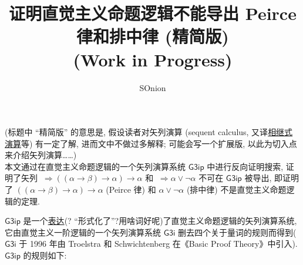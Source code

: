 \documentclass{article}
\title{证明直觉主义命题逻辑不能导出 Peirce 律和排中律 (精简版)\\(Work in Progress)}
\author{SOnion}
\def\To{\Rightarrow}
\def\a{\alpha}
\def\b{\beta}
\def\Gthreeip{$ \mathsf{G3ip}$ }
\def\Gthreei{$ \mathsf{G3i}$ }
\begin{document}
\maketitle




(标题中 ``精简版'' 的意思是, 假设读者对矢列演算 (sequent calculus, 又译\underline{相继式演算}等) 有一定了解, 进而文中不做过多解释; 可能会写一个扩展版, 以此为切入点来介绍矢列演算……)\\

本文通过在直觉主义命题逻辑的一个矢列演算系统 \Gthreeip 中进行反向证明搜索, 证明了矢列 $~\To((\a\to\b)\to\a)\to\a$ 和 $~\To \a\lor\neg\a$ 不可在 \Gthreeip 被导出, 即证明了 $((\a\to\b)\to\a)\to\a$ (Peirce 律) 和 $\a\lor\neg\a$ (排中律) 不是直觉主义命题逻辑的定理. 

\Gthreeip 是一个\underline{表达}(? ``形式化了''?用啥词好呢)了直觉主义命题逻辑的矢列演算系统, 它由直觉主义一阶逻辑的一个矢列演算系统 \Gthreei 删去四个关于量词的规则而得到(\Gthreei 于 1996 年由 Troelstra 和 Schwichtenberg 在《Basic Proof Theory》中引入). \Gthreeip 的规则如下:
\end{document}

